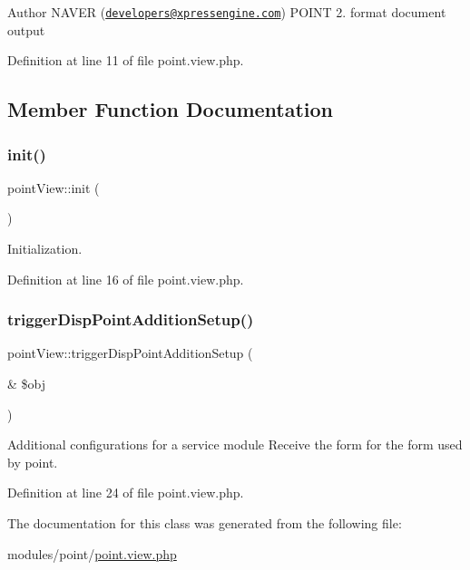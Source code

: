 \begin{DoxyAuthor}{Author}
N\+A\+V\+ER (\href{mailto:developers@xpressengine.com}{\tt developers@xpressengine.\+com}) P\+O\+I\+NT 2. format document output 
\end{DoxyAuthor}


Definition at line 11 of file point.\+view.\+php.



\subsection{Member Function Documentation}
\hypertarget{classpointView_aa86b46a942ef2352a7db0019de88368a}{}\label{classpointView_aa86b46a942ef2352a7db0019de88368a} 
\subsubsection{\texorpdfstring{init()}{init()}}
{\footnotesize\ttfamily point\+View\+::init (\begin{DoxyParamCaption}{ }\end{DoxyParamCaption})}



Initialization. 



Definition at line 16 of file point.\+view.\+php.

\hypertarget{classpointView_a9249042127504b50e7c92cdff40a8ac5}{}\label{classpointView_a9249042127504b50e7c92cdff40a8ac5} 
\subsubsection{\texorpdfstring{trigger\+Disp\+Point\+Addition\+Setup()}{triggerDispPointAdditionSetup()}}
{\footnotesize\ttfamily point\+View\+::trigger\+Disp\+Point\+Addition\+Setup (\begin{DoxyParamCaption}\item[{\&}]{\$obj }\end{DoxyParamCaption})}



Additional configurations for a service module Receive the form for the form used by point. 



Definition at line 24 of file point.\+view.\+php.



The documentation for this class was generated from the following file\+:\begin{DoxyCompactItemize}
\item 
modules/point/\hyperlink{point_8view_8php}{point.\+view.\+php}\end{DoxyCompactItemize}
